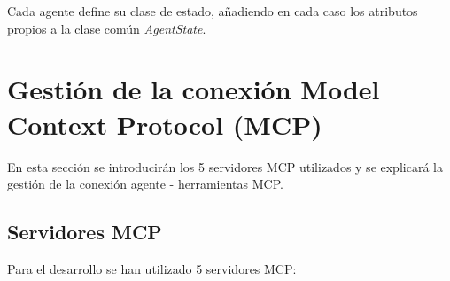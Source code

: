 Cada agente define su clase de estado, añadiendo en cada caso los atributos propios a la clase común \textit{AgentState}.

\section{Gestión de la conexión Model Context Protocol (MCP)}

En esta sección se introducirán los 5 servidores MCP utilizados y se explicará la gestión de la conexión agente - herramientas MCP. 

\subsection{Servidores MCP}
Para el desarrollo se han utilizado 5 servidores MCP:


